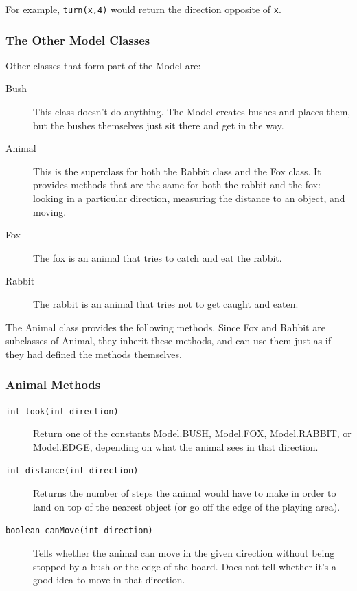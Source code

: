 \documentclass[10pt,letterpaper]{article}
\begin{document}
	For example, \texttt{turn(x,4)} would return the direction opposite of \texttt{x}.
	
	
	\subsubsection{The Other Model Classes}
	Other classes that form part of the Model are:
	\begin{description}
		\item[Bush] This class doesn't do anything. The Model creates bushes and places them, but the bushes themselves just sit there and get in the way.
		\item[Animal] This is the superclass for both the Rabbit class and the Fox class. It provides methods that are the same for both the rabbit and the fox: looking in a particular direction, measuring the distance to an object, and moving.
		\item[Fox] The fox is an animal that tries to catch and eat the rabbit.
		\item[Rabbit] The rabbit is an animal that tries not to get caught and eaten.
		
	\end{description}
	
	The Animal class provides the following methods. Since Fox and Rabbit are subclasses of Animal, they inherit these methods, and can use them just as if they had defined the methods themselves.
	\newpage
	\subsubsection{Animal Methods}
	\begin{description}
	\item[\texttt{int look(int direction)}]
	Return one of the constants Model.BUSH, Model.FOX, Model.RABBIT, or Model.EDGE, depending on what the animal sees in that direction.
	\item[\texttt{int distance(int direction)}]
	Returns the number of steps the animal would have to make in order to land on top of the nearest object (or go off the edge of the playing area).
	\item[\texttt{boolean canMove(int direction)}]
	Tells whether the animal can move in the given direction without being stopped by a bush or the edge of the board. Does not tell whether it's a good idea to move in that direction. 
	\end{description}
	
	
	
\end{document}
